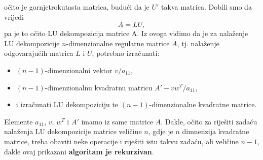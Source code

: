 \documentclass[a4paper,12pt,oneside]{article}
\begin{document}
očito je gornjetrokutasta matrica, budući da je $U'$ takva matrica. \newline\newline
\noindent Dobili smo da vrijedi
$$A = LU,$$
pa je to očito LU dekompozicija matrice A. \newline \newline
\noindent Iz ovoga vidimo da je za nalaženje LU dekompozicije $n$-dimenzionalne regularne matrice $A$, tj. nalaženje odgovarajućih matrica $L$ i $U$, potrebno izračunati:
\begin{itemize}
	\item $(n-1)$-dimenzionalni vektor $v/a_{11}$,
	\item $(n-1)$-dimenzionalnu kvadratnu matricu $A' - vw^T/a_{11}$,
	\item i izračunati LU dekompoziciju te  $(n-1)$-dimenzionalne kvadratne matrice.
\end{itemize}
Elemente $a_{11}$, $v$, $w^T$ i $A'$ imamo iz same matrice $A$.\newline \newline
\noindent Dakle, očito za riješiti zadaću nalaženja LU dekompozicije matrice veličine $n$, gdje je $n$ dimnenzija kvadratne matrice, treba obaviti neke operacije i riješiti istu takvu zadaću, ali veličine $n-1$, dakle ovaj prikazani \textbf{algoritam je
rekurzivan}.
\end{document}
